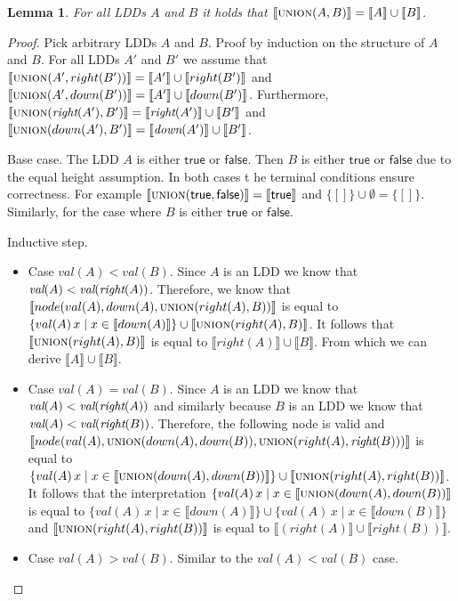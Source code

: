 \documentclass[a4paper]{article}
\newcommand{\var}[1]{\textit{#1}}
\newcommand{\interpret}[1]{\llbracket #1 \rrbracket}
\newtheorem{lemma}[theorem]{Lemma}
\begin{document}
\begin{lemma}
	For all LDDs $A$ and $B$ it holds that $\interpret{\textsc{union}(A, B)} = \interpret{A} \cup \interpret{B}$.
\end{lemma}
\begin{proof}
	Pick arbitrary LDDs $A$ and $B$.
	Proof by induction on the structure of $A$ and $B$.	
	For all LDDs $A'$ and $B'$ we assume that $\interpret{\textsc{union}(A', right(B'))} = \interpret{A'} \cup \interpret{right(B')}$ and $\interpret{\textsc{union}(A', down(B'))} = \interpret{A'} \cup \interpret{down(B')}$.
	Furthermore, $\interpret{\textsc{union}(\var{right}(A'), B')} = \interpret{\var{right}(A')} \cup \interpret{B'}$ and $\interpret{\textsc{union}(down(A'), B')} = \interpret{\var{down}(A')} \cup \interpret{B'}$.
	
	Base case.
	The LDD $A$ is either $\textsf{true}$ or $\textsf{false}$.
	Then $B$ is either $\textsf{true}$ or $\textsf{false}$ due to the equal height assumption.
	In both cases t he terminal conditions ensure correctness.
	For example $\interpret{\textsc{union}(\textsf{true}, \textsf{false})} = \interpret{\textsf{true}}$ and $\{[]\} \cup \emptyset = \{[]\}$.	
	Similarly, for the case where $B$ is either $\textsf{true}$ or $\textsf{false}$.
	
	Inductive step.
	\begin{itemize}
	\item Case $val(A) < val(B)$.
		Since $A$ is an LDD we know that $\textit{val}(A) < \textit{val}(\textit{right}(A))$.
		Therefore, we know that $\interpret{node(val(A), down(A), \textsc{union}(right(A), B))}$ is equal to $\{val(A)\,x \mid x \in \interpret{down(A)}\} \cup \interpret{\textsc{union}(right(A), B)}$.
		It follows that $\interpret{\textsc{union}(right(A), B)}$ is equal to $\interpret{right(A)} \cup \interpret{B}$.
		From which we can derive $\interpret{A} \cup \interpret{B}$.

	\item Case $val(A) = val(B)$.
		Since $A$ is an LDD we know that $\textit{val}(A) < \textit{val}(\textit{right}(A))$ and similarly because $B$ is an LDD we know that $\textit{val}(A) < \textit{val}(\textit{right}(B))$.
		Therefore, the following node is valid and $\interpret{node(val(A), \textsc{union}(down(A), down(B)), \textsc{union}(right(A), \var{right}(B)))}$ is equal to  $\{val(A)\,x \mid x \in \interpret{\textsc{union}(down(A), down(B))}\} \cup \interpret{\textsc{union}(right(A), right(B))}$.
		It follows that the interpretation $\{val(A)\,x \mid x \in \interpret{\textsc{union}(down(A), down(B))}$ is equal to $\{val(A)\,x \mid x \in \interpret{down(A)}\} \cup \{val(A)\,x \mid x \in \interpret{down(B)}\}$ and $\interpret{\textsc{union}(right(A), right(B))}$ is equal to $\interpret{(right(A)} \cup \interpret{right(B))}$.
	
	\item Case $val(A) > val(B)$.
		Similar to the $val(A) < val(B)$ case.	\qedhere	
	\end{itemize} 
\end{proof}
\end{document}
